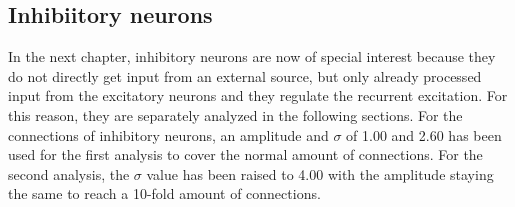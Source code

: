 \documentclass[14pt]{SelfArx} %
\numberwithin{equation}{section}
\begin{document}
\subsection{Inhibiitory neurons}
In the next chapter, inhibitory neurons are now of special interest because they do not directly get input from an external source, but only already processed input from the excitatory neurons and they regulate the recurrent excitation. For this reason, they are separately analyzed in the following sections. \newline
For the connections of inhibitory neurons, an amplitude and $\sigma$ of 1.00 and 2.60 has been used for the first analysis to cover the normal amount of connections. For the second analysis, the $\sigma$ value has been raised to 4.00 with the amplitude staying the same to reach a 10-fold amount of connections.
\label{sec:resultin}
\end{document}
